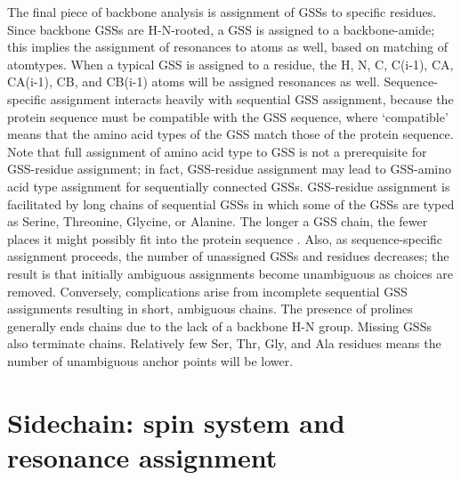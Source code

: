 The final piece of backbone analysis is assignment of GSSs to specific 
residues.  Since backbone GSSs are H-N-rooted, a GSS is assigned to a 
backbone-amide; this implies the assignment of resonances to atoms as well, 
based on matching of atomtypes.  When a typical GSS is assigned to a residue, 
the H, N, C, C(i-1), CA, CA(i-1), CB, and CB(i-1) atoms will be assigned 
resonances as well.  Sequence-specific assignment interacts heavily with 
sequential GSS assignment, because the protein sequence must be compatible 
with the GSS sequence, where `compatible' means that the amino acid types 
of the GSS match those of the protein sequence.  Note that full assignment 
of amino acid type to GSS is not a prerequisite for GSS-residue assignment; 
in fact, GSS-residue assignment may lead to GSS-amino acid type assignment 
for sequentially connected GSSs.  GSS-residue assignment is facilitated by 
long chains of sequential GSSs in which some of the GSSs are typed as Serine, 
Threonine, Glycine, or Alanine.  The longer a GSS chain, the fewer places it 
might possibly fit into the protein sequence \cite{saga}.  Also, 
as sequence-specific assignment proceeds, the number of unassigned GSSs and 
residues decreases; the result is that initially ambiguous assignments become 
unambiguous as choices are removed.  Conversely, complications arise from 
incomplete sequential GSS assignments resulting in short, ambiguous chains.  
The presence of prolines generally ends chains due to the lack of a backbone 
H-N group.  Missing GSSs also terminate chains.  Relatively few Ser, Thr, Gly, 
and Ala residues means the number of unambiguous anchor points will be lower.


\section{Sidechain: spin system and resonance assignment}

